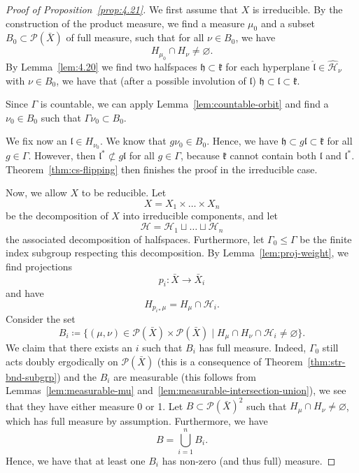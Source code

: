 \begin{proof}[Proof of Proposition~\ref{prop:4.21}]
  We first assume that \(X\) is irreducible. By the construction of the product measure, we find a measure \(\mu_0\) and a subset \(B_0 \subset \mathcal{P}(\bar X)\) of full measure, such that for all \(\nu \in B_0\), we have
  \[
    H_{\mu_0} \cap H_\nu \neq \varnothing.
  \]
  By Lemma~\ref{lem:4.20} we find two halfspaces \(\mathfrak{h} \subset \mathfrak{k}\) for each hyperplane \(\mathfrak{\hat l} \in \mathcal{\hat H}_\nu\) with \(\nu \in B_0\), we have that (after a possible involution of \(\mathfrak{l}\)) \(\mathfrak{h} \subset \mathfrak{l} \subset \mathfrak{k}\).

  Since \(\Gamma\) is countable, we can apply Lemma~\ref{lem:countable-orbit} and find a \(\nu_0 \in B_0\) such that \(\Gamma \nu_0 \subset B_0\). 

  We fix now an \(\mathfrak{l} \in H_{\nu_0}\). We know that \(g\nu_0 \in B_0\). Hence, we have \(\mathfrak{h} \subset g\mathfrak{l} \subset \mathfrak{k}\) for all \(g \in \Gamma\). However, then \(\mathfrak{l}^\ast \not \subset g\mathfrak{l}\) for all \(g \in \Gamma\), because \(\mathfrak{k}\) cannot contain both \(\mathfrak{l}\) and \(\mathfrak{l}^\ast\). Theorem~\ref{thm:cs-flipping} then finishes the proof in the irreducible case.

  Now, we allow \(X\) to be reducible. Let
      \[
        X = X_1 \times \dots \times X_n
      \]
      be the decomposition of \(X\) into irreducible components, and let
      \[
        \mathcal{H} = \mathcal{H}_1 \sqcup \dots \sqcup \mathcal{H}_n
      \]
      the associated decomposition of halfspaces. Furthermore, let \(\Gamma_0 \leq \Gamma\) be the finite index subgroup respecting this decomposition. By Lemma~\ref{lem:proj-weight}, we find projections
      \[
        p_i\colon \bar X \to \bar X_i
      \]
      and have
      \[
        H_{p_{i\ast}\mu} = H_\mu \cap \mathcal{H}_i.
      \]
      Consider the set 
      \[
        B_i \coloneqq \{(\mu, \nu) \in \mathcal{P}(\bar X) \times \mathcal{P}(\bar X) \mid H_\mu \cap H_\nu \cap \mathcal{H}_i \neq \varnothing\}. 
      \]
      We claim that there exists an \(i\) such that \(B_i\) has full measure. Indeed, \(\Gamma_0\) still acts doubly ergodically on \(\mathcal{P}(\bar X)\) (this is a consequence of Theorem~\ref{thm:str-bnd-subgrp}) and the \(B_i\) are measurable (this follows from Lemmas~\ref{lem:measurable-mu} and\ \ref{lem:measurable-intersection-union}), we see that they have either measure 0 or 1. Let \(B \subset \mathcal{P}(\bar X)^2\) such that \(H_\mu \cap H_\nu \neq \varnothing\), which has full measure by assumption. Furthermore, we have
      \[
        B = \bigcup_{i=1}^n B_i.
      \]
      Hence, we have that at least one \(B_i\) has non-zero (and thus full) measure.


\end{proof}
